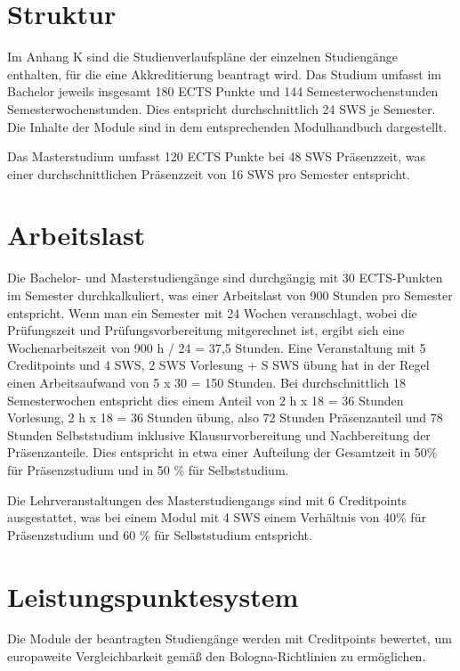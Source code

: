 \section{Struktur}\label{struktur}

Im Anhang K sind die Studienverlaufspläne der einzelnen Studiengänge
enthalten, für die eine Akkreditierung beantragt wird. Das Studium
umfasst im Bachelor jeweils insgesamt 180 ECTS Punkte und 144
Semesterwochenstunden Semesterwochenstunden. Dies entspricht
durchschnittlich 24 SWS je Semester. Die Inhalte der Module sind in dem
entsprechenden Modulhandbuch dargestellt.

Das Masterstudium umfasst 120 ECTS Punkte bei 48 SWS Präsenzzeit, was
einer durchschnittlichen Präsenzzeit von 16 SWS pro Semester entspricht.

\section{Arbeitslast}\label{arbeitslast}

Die Bachelor- und Masterstudiengänge sind durchgängig mit 30
ECTS-Punkten im Semester durchkalkuliert, was einer Arbeitslast von 900
Stunden pro Semester entspricht. Wenn man ein Semester mit 24 Wochen
veranschlagt, wobei die Prüfungszeit und Prüfungsvorbereitung
mitgerechnet ist, ergibt sich eine Wochenarbeitszeit von 900 h / 24 =
37,5 Stunden. Eine Veranstaltung mit 5 Creditpoints und 4 SWS, 2 SWS
Vorlesung + S SWS übung hat in der Regel einen Arbeitsaufwand von 5 x 30
= 150 Stunden. Bei durchschnittlich 18 Semesterwochen entspricht dies
einem Anteil von 2 h x 18 = 36 Stunden Vorlesung, 2 h x 18 = 36 Stunden
übung, also 72 Stunden Präsenzanteil und 78 Stunden Selbststudium
inklusive Klausurvorbereitung und Nachbereitung der Präsenzanteile. Dies
entspricht in etwa einer Aufteilung der Gesamtzeit in 50\% für
Präsenzstudium und in 50 \% für Selbststudium.

Die Lehrveranstaltungen des Masterstudiengangs sind mit 6 Creditpoints
ausgestattet, was bei einem Modul mit 4 SWS einem Verhältnis von 40\%
für Präsenzstudium und 60 \% für Selbststudium entspricht.

\section{Leistungspunktesystem}\label{leistungspunktesystem}

Die Module der beantragten Studiengänge werden mit Creditpoints
bewertet, um europaweite Vergleichbarkeit gemäß den Bologna-Richtlinien
zu ermöglichen.

